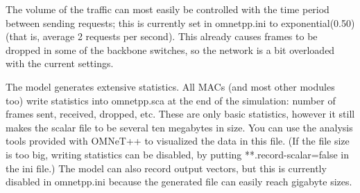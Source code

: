 The volume of the traffic can most easily be controlled with the
time period between sending requests; this is currently
set in omnetpp.ini to exponential(0.50) (that is, average 2
requests per second). This already causes frames to be dropped
in some of the backbone switches, so the network is a bit
overloaded with the current settings.

The model generates extensive statistics. All MACs (and most other
modules too) write statistics into omnetpp.sca at the end
of the simulation: number of frames sent, received, dropped, etc.
These are only basic statistics, however it still makes the
scalar file to be several ten megabytes in size. You can use
the analysis tools provided with OMNeT++ to visualized the data
in this file. (If the file size is too big, writing statistics
can be disabled, by putting **.record-scalar=false in the ini file.)
The model can also record output vectors, but this is currently
disabled in omnetpp.ini because the generated file can easily reach
gigabyte sizes.

